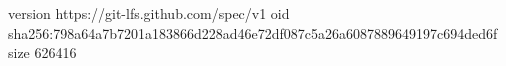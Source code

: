 version https://git-lfs.github.com/spec/v1
oid sha256:798a64a7b7201a183866d228ad46e72df087c5a26a6087889649197c694ded6f
size 626416
